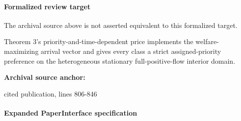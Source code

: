 \documentclass[10pt]{article}
\begin{document}
\paragraph{Formalized review target}
The archival source above is not asserted equivalent to this formalized target.
\begin{ReviewVerbatim}
Theorem 3's priority-and-time-dependent price implements the welfare-maximizing arrival vector and gives every class a strict assigned-priority preference on the heterogeneous stationary full-positive-flow interior domain.
\end{ReviewVerbatim}

\textbf{Archival source anchor:} {\footnotesize\raggedright cited publication, lines 806-\allowbreak{}846\par}
\paragraph{Expanded PaperInterface specification}
\end{document}
